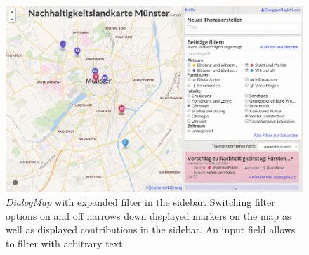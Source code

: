 \begin{figure}[b]
    \centering
    \includegraphics[width=1\columnwidth]{images/screenshot_filters}
    \caption{\textit{DialogMap} with expanded filter in the sidebar. Switching filter options on and off narrows down displayed markers on the map as well as displayed contributions in the sidebar. An input field allows to filter with arbitrary text.}
    \label{fig:screenshot_filter}
\end{figure}


